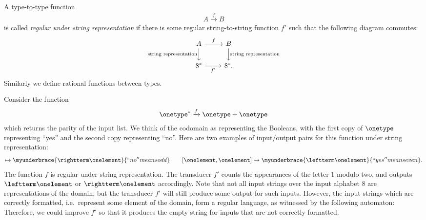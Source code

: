 \begin{definition}\label{def:regular-functions-on-types-under-string-representation}
    A type-to-type function
    \begin{align*}
    A \xrightarrow f  B
    \end{align*}
    is called \emph{regular under string representation} if there is some regular string-to-string function $f'$ such that the following diagram commutes:
    \[
    \begin{tikzcd}
    A 
    \ar[r,"f"]
    \ar[d,"\text{string representation}"']
    &
    \ar[d,"\text{string representation}"]
    B
    \\
    8^* 
    \ar[r,"f'"']
    &
    8^*.
    \end{tikzcd}
    \]
     Similarly we define rational functions between types.
\end{definition}

\begin{myexample}
    Consider the function 
    \begin{align*}
    \onetype^* \xrightarrow f \onetype + \onetype
    \end{align*}
    which returns the parity of the input list. We think of the codomain as representing the Booleans, with the first copy of $\onetype$ representing ``yes'' and the second copy representing ``no''. Here are two examples of input/output pairs for this function under string representation:
    \begin{align*}
    [\onelement,\onelement,\onelement] \mapsto \myunderbrace{\rightterm\onelement}{``no'' means odd} \qquad [\onelement,\onelement] \mapsto \myunderbrace{\leftterm\onelement}{``yes'' means even}.
    \end{align*}
    The function $f$ is regular under string representation. The transducer $f'$ counts the appearances of the letter $1$ modulo two, and outputs $\leftterm\onelement$ or $\rightterm\onelement$ accordingly. Note that not all input strings over the input alphabet $8$ are representations of the domain, but the transducer $f'$ will still produce some output  for such inputs. However, the input strings which are correctly formatted, i.e.~represent some element of the domain, form a regular language, as witnessed by the following automaton:
Therefore, we could improve $f'$ so that it produces the empty string for inputs that are not correctly formatted.
\end{myexample}


